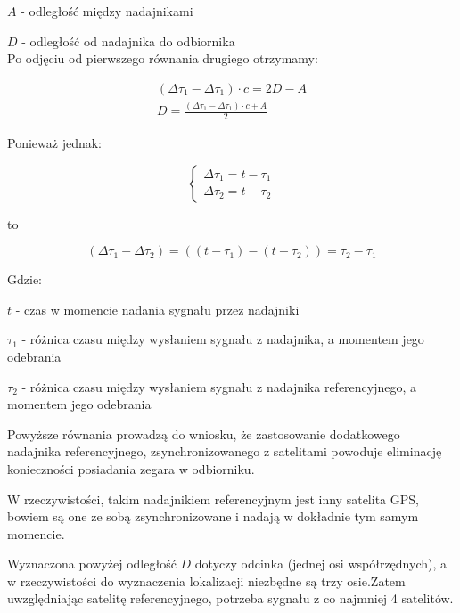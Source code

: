 $A$ - odległość między nadajnikami

$D$ - odległość od nadajnika do odbiornika\\

Po odjęciu od pierwszego równania drugiego otrzymamy:

\begin{gather}
(\Delta \tau_1  - \Delta \tau_1) \cdot c = 2D - A \\
D = \frac{(\Delta \tau_1  - \Delta \tau_1) \cdot c + A}{2} \nonumber 
\end{gather}

Ponieważ jednak:

\begin{equation}
\begin{cases}
	\Delta \tau_1 = t - \tau_1 \\
	\Delta \tau_2 = t- \tau_2
\end{cases}
\end{equation}

to

\begin{equation}
(\Delta \tau_1 - \Delta \tau_2) = ((t - \tau_1) - (t - \tau_2)) = \tau_2 - \tau_1
\end{equation}

Gdzie:

$t$ - czas w momencie nadania sygnału przez nadajniki

$\tau_1$ - różnica czasu między wysłaniem sygnału z nadajnika, a momentem jego odebrania

$\tau_2$ - różnica czasu między wysłaniem sygnału z nadajnika referencyjnego, a momentem jego odebrania

Powyższe równania prowadzą do wniosku, że zastosowanie dodatkowego nadajnika referencyjnego, zsynchronizowanego z satelitami powoduje eliminację konieczności posiadania zegara w odbiorniku.

W rzeczywistości, takim nadajnikiem referencyjnym jest inny satelita GPS, bowiem są one ze sobą zsynchronizowane i nadają w dokładnie tym samym momencie.

Wyznaczona powyżej odległość $D$ dotyczy odcinka (jednej osi współrzędnych), a w rzeczywistości do wyznaczenia lokalizacji niezbędne są trzy osie.Zatem uwzględniając satelitę referencyjnego, potrzeba sygnału z co najmniej 4 satelitów.

